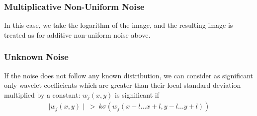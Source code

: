 \subsubsection*{Multiplicative Non-Uniform Noise}
In this case, we take the logarithm of the image, and the resulting image
is treated as for additive non-uniform noise above.

\subsubsection*{Unknown Noise}
If the noise does not follow any known distribution, 
we can consider as significant
only wavelet coefficients which are greater than their local standard deviation
multiplied by a constant: $w_j(x,y)$ is significant if 
\begin{eqnarray}
\mid w_j(x,y) \mid \ > \ k \sigma(w_j(x-l \dots x+l, y-l \dots y+l)) 
\end{eqnarray}


 
 
